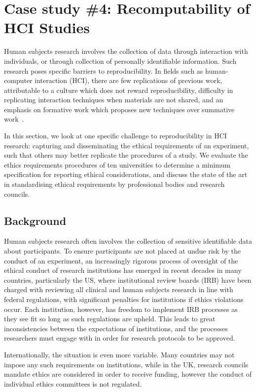 \section{Case study \#4: Recomputability of HCI Studies}
\label{s:group4}

Human subjects research involves the collection of data through interaction
with individuals, or through collection of personally identifiable
information. Such research poses specific barriers to reproducibility. In
fields such as human-computer interaction (HCI), there are few replications of
previous work, attributable to a culture which does not reward
reproducibility, difficulty in replicating interaction techniques when
materials are not shared, and an emphasis on formative work which proposes new
techniques over summative work~\cite{hornbaek:replications}.

In this section, we look at one specific challenge to reproducibility in HCI
research: capturing and disseminating the ethical requirements of an
experiment, such that others may better replicate the procedures of a
study. We evaluate the ethics requirements procedures of ten universities to
determine a minimum specification for reporting ethical considerations, and
discuss the state of the art in standardising ethical requirements by
professional bodies and research councils.

\subsection{Background}
Human subjects research often involves the collection
of sensitive identifiable data about participants. To ensure participants are
not placed at undue risk by the conduct of an experiment, an increasingly
rigorous process of oversight of the ethical conduct of research institutions
has emerged in recent decades in many countries, particularly the US, where
institutional review boards (IRB) have been charged with reviewing all
clinical and human subjects research in line with federal regulations, with
significant penalties for institutions if ethics violations occur. Each
institution, however, has freedom to implement IRB processes as they see fit
so long as such regulations are upheld. This leads to great inconsistencies
between the expectations of institutions, and the processes researchers must
engage with in order for research protocols to be approved.

Internationally, the situation is even more variable. Many countries may not
impose any such requirements on institutions, while in the UK, research
councils mandate ethics are considered in order to receive funding, however
the conduct of individual ethics committees is not regulated.

